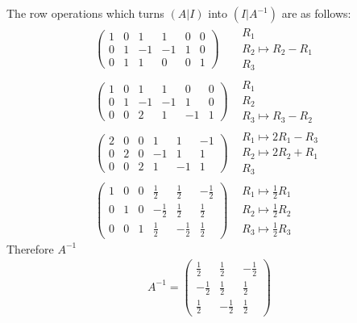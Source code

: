 \documentclass[12pt]{article}
\begin{document}
The row operations which turns $(A|I)$ into $(I|A^{-1})$ are as follows:
\begin{align}
\left(\begin{array}{ccc|ccc}
1 & 0 & 1 & 1 & 0 & 0 \\
0 & 1 & -1 & -1 & 1 & 0 \\
0 & 1 & 1 & 0 & 0 & 1
\end{array}\right)&
\begin{array}{l}
  \text{$R_1$}\\
  \text{$R_2 \longmapsto R_2 - R_1$}\\
  \text{$R_3$ }
\end{array} 
\\
\left(\begin{array}{ccc|ccc}
1 & 0 & 1 & 1 & 0 & 0 \\
0 & 1 & -1 & -1 & 1 & 0 \\
0 & 0 & 2 & 1 & -1 & 1
\end{array}\right)&
\begin{array}{l}
  \text{$R_1$}\\
  \text{$R_2$}\\
  \text{$R_3 \longmapsto R_3 - R_2$ }
\end{array}
\\
\left(\begin{array}{ccc|ccc}
2 & 0 & 0 & 1 & 1 & -1 \\
0 & 2 & 0 & -1 & 1 & 1 \\
0 & 0 & 2 & 1 & -1 & 1
\end{array}\right)&
\begin{array}{l}
  \text{$R_1 \longmapsto 2R_1-R_3$}\\
  \text{$R_2 \longmapsto 2R_2+R_1$}\\
  \text{$R_3$ }
\end{array}
\\
\left(\begin{array}{ccc|ccc}
1 & 0 & 0 & \frac{1}{2} & \frac{1}{2} & -\frac{1}{2} \\
0 & 1 & 0 & -\frac{1}{2} & \frac{1}{2} & \frac{1}{2} \\
0 & 0 & 1 & \frac{1}{2} & -\frac{1}{2} & \frac{1}{2}
\end{array}\right)&
\begin{array}{l}
  \text{$R_1 \longmapsto \frac{1}{2}R_1$}\\
  \text{$R_2 \longmapsto \frac{1}{2}R_2$}\\
  \text{$R_3 \longmapsto \frac{1}{2}R_3$}
\end{array}
\end{align}
Therefore $A^{-1}$
\begin{align}
A^{-1}= \left(\begin{array}{ccc}
\frac{1}{2} & \frac{1}{2} & -\frac{1}{2} \\
-\frac{1}{2} & \frac{1}{2} & \frac{1}{2} \\
\frac{1}{2} & -\frac{1}{2} & \frac{1}{2}
\end{array}\right)
\end{align}
\end{document}
